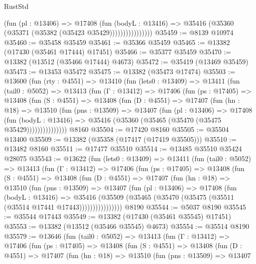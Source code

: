 \begin{lexlean}{RustStd}
\begin{coremodule}
                        (fun (pl : @13406) =>
                        @17408
                          (fun (bodyL : @13416) =>
                          @35416 (@35360 (@35371 (@35382 (@35423 @35429))))))))))))))))
@35459 := @8139 @10974
@35460 := @35458 @35459
@35461 := @35366 @35459
@35465 := @13382 (@17430 (@35461 @17444) @17451)
@35466 := @35377 @35459
@35470 := @13382 (@13512 (@35466 @17444) @4673)
@35472 := @35419 (@13469 @35459)
@35473 := @13453 @35472
@35475 := @13382 (@35473 @17474)
@35503 := @13600
    (fun (rty : @4551) =>
    @13410
      (fun (lets0 : @13409) =>
      @13411
        (fun (tail0 : @5052) =>
        @13413
          (fun (Γ : @13412) =>
          @17406
            (fun (ps : @17405) =>
            @13408
              (fun (S : @4551) =>
              @13408
                (fun (D : @4551) =>
                @17407
                  (fun (hn : @18) =>
                  @13510
                    (fun (pns : @13509) =>
                    @13407
                      (fun (pl : @13406) =>
                      @17408
                        (fun (bodyL : @13416) =>
                        @35416 (@35360 (@35465 (@35470 (@35475 @35429)))))))))))))))
    @8160
@35504 := @17420 @8160
@35505 := @35504 @13400
@35509 := @13382 (@35358 (@17417 (@17419 @35505)))
@35510 := @13482 @8160
@35511 := @17477 @35510
@35514 := @13485 @35510 @35424 @28075
@35543 := @13622
    (fun (lets0 : @13409) =>
    @13411
      (fun (tail0 : @5052) =>
      @13413
        (fun (Γ : @13412) =>
        @17406
          (fun (ps : @17405) =>
          @13408
            (fun (S : @4551) =>
            @13408
              (fun (D : @4551) =>
              @17407
                (fun (hn : @18) =>
                @13510
                  (fun (pns : @13509) =>
                  @13407
                    (fun (pl : @13406) =>
                    @17408
                      (fun (bodyL : @13416) =>
                      @35416
                        (@35509
                          (@35465 (@35470 (@35475 (@35511 (@35514 @17441 @17443))))))))))))))))
    @8190
@35544 := @5037 @8190
@35545 := @35544 @17443
@35549 := @13382 (@17430 (@35461 @35545) @17451)
@35553 := @13382 (@13512 (@35466 @35545) @4673)
@35554 := @35514 @8190
@35579 := @13646
    (fun (tail0 : @5052) =>
    @13413
      (fun (Γ : @13412) =>
      @17406
        (fun (ps : @17405) =>
        @13408
          (fun (S : @4551) =>
          @13408
            (fun (D : @4551) =>
            @17407
              (fun (hn : @18) =>
              @13510
                (fun (pns : @13509) =>
                @13407

\end{coremodule}
\end{lexlean}
